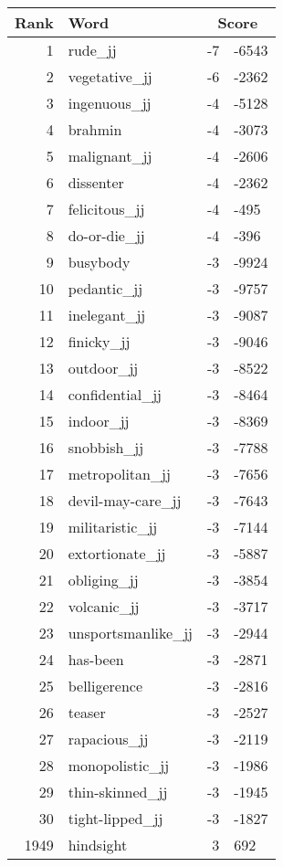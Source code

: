 \begin{longtable}[!htbp]{| rlr@{.}l |}
    \hline
    \textbf{Rank} & \textbf{Word} & \multicolumn{2}{c|}{\textbf{Score}} \\
    \hline
    \endhead
    1 & rude\_jj & -7 & -6543 \\
    2 & vegetative\_jj & -6 & -2362 \\
    3 & ingenuous\_jj & -4 & -5128 \\
    4 & brahmin & -4 & -3073 \\
    5 & malignant\_jj & -4 & -2606 \\
    6 & dissenter & -4 & -2362 \\
    7 & felicitous\_jj & -4 & -495 \\
    8 & do-or-die\_jj & -4 & -396 \\
    9 & busybody & -3 & -9924 \\
    10 & pedantic\_jj & -3 & -9757 \\
    11 & inelegant\_jj & -3 & -9087 \\
    12 & finicky\_jj & -3 & -9046 \\
    13 & outdoor\_jj & -3 & -8522 \\
    14 & confidential\_jj & -3 & -8464 \\
    15 & indoor\_jj & -3 & -8369 \\
    16 & snobbish\_jj & -3 & -7788 \\
    17 & metropolitan\_jj & -3 & -7656 \\
    18 & devil-may-care\_jj & -3 & -7643 \\
    19 & militaristic\_jj & -3 & -7144 \\
    20 & extortionate\_jj & -3 & -5887 \\
    21 & obliging\_jj & -3 & -3854 \\
    22 & volcanic\_jj & -3 & -3717 \\
    23 & unsportsmanlike\_jj & -3 & -2944 \\
    24 & has-been & -3 & -2871 \\
    25 & belligerence & -3 & -2816 \\
    26 & teaser & -3 & -2527 \\
    27 & rapacious\_jj & -3 & -2119 \\
    28 & monopolistic\_jj & -3 & -1986 \\
    29 & thin-skinned\_jj & -3 & -1945 \\
    30 & tight-lipped\_jj & -3 & -1827 \\
    1949 & hindsight & 3 & 692 \\

\end{longtable}
